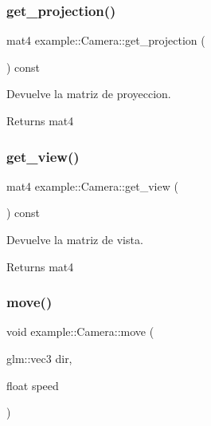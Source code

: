 \subsubsection{\texorpdfstring{get\_projection()}{get\_projection()}}
{\footnotesize\ttfamily mat4 example\+::\+Camera\+::get\+\_\+projection (\begin{DoxyParamCaption}{ }\end{DoxyParamCaption}) const\hspace{0.3cm}{\ttfamily [inline]}}



Devuelve la matriz de proyeccion. 

\begin{DoxyReturn}{Returns}
mat4 
\end{DoxyReturn}
\mbox{\label{classexample_1_1_camera_a0422ecf5eb81c6a6c1f816ba4013cd7b}} 
\subsubsection{\texorpdfstring{get\_view()}{get\_view()}}
{\footnotesize\ttfamily mat4 example\+::\+Camera\+::get\+\_\+view (\begin{DoxyParamCaption}{ }\end{DoxyParamCaption}) const\hspace{0.3cm}{\ttfamily [inline]}}



Devuelve la matriz de vista. 

\begin{DoxyReturn}{Returns}
mat4 
\end{DoxyReturn}
\mbox{\label{classexample_1_1_camera_ac85de92e05dfb5be2d4194dba06ca276}} 
\subsubsection{\texorpdfstring{move()}{move()}}
{\footnotesize\ttfamily void example\+::\+Camera\+::move (\begin{DoxyParamCaption}\item[{glm\+::vec3}]{dir,  }\item[{float}]{speed }\end{DoxyParamCaption})}



